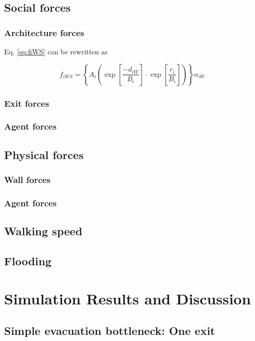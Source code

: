 \documentclass[11pt]{article}
\begin{document}
\subsection{Social forces}

\subsubsection{Architecture forces}

Eq. \eqref{eq:fiWS} can be rewritten as

\begin{equation}
	{f_{iWS}} = \left\{ {{A_i}\left( {\exp \left[ {\frac{{ - {d_{iW}}}}{{{B_i}}}} \right] \cdot \exp \left[ {\frac{{{r_i}}}{{{B_i}}}} \right]} \right)} \right\}{n_{iW}}
	\label{eq:fiWS2}
\end{equation}



\subsubsection{Exit forces}
\subsubsection{Agent forces}
\subsection{Physical forces}

\subsubsection{Wall forces}

\subsubsection{Agent forces}
\subsection{Walking speed}
\subsection{Flooding}


\section{Simulation Results and Discussion}
\subsection{Simple evacuation bottleneck: One exit}
\end{document}

